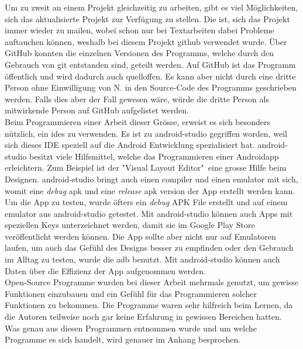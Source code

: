 \documentclass[a4paper,11pt]{article}
\begin{document}
Um zu zweit an einem Projekt gleichzeitig zu arbeiten, gibt es viel Möglichkeiten, sich das aktualisierte Projekt zur Verfügung zu stellen. Die  ist, sich das 
Projekt immer wieder zu mailen, wobei schon nur bei Textarbeiten dabei Probleme auftauchen können, weshalb bei diesem Projekt \Gls{github} 
verwendet wurde. Über GitHub konnten die einzelnen Versionen des Programms, welche durch den Gebrauch von \gls{git} entstanden sind, geteilt werden. 
Auf GitHub ist das Programm öffentlich und wird dadurch auch quelloffen. Es kann aber nicht durch eine dritte Person ohne Einwilligung von N. in den Source-Code
des Programms geschrieben werden. Falls dies aber der Fall gewesen wäre, würde die dritte Person als mitwirkende Person auf GitHub aufgelistet werden. \cite{github} \\

Beim Programmieren einer Arbeit dieser Grösse, erweist es sich besonders nützlich, ein \glspl{ide} zu verwenden. Es ist zu \gls{android-studio} gegriffen worden, weil sich dieses 
IDE speziell auf die Android Entwicklung spezialisiert hat. \gls{android-studio} besitzt viele Hilfsmittel, welche das Programmieren einer Androidapp erleichtern. Zum Beispiel ist der
"Visual Layout Editor"\ eine grosse Hilfe beim Designen. \gls{android-studio} bringt auch einen \gls{compiler} und einen \gls{emulator} mit sich, womit eine \textit{debug} \gls{apk} und eine
\textit{release} \gls{apk} version der App erstellt werden kann. Um die App zu testen, wurde öfters ein \textit{debug} APK File erstellt und auf einem \gls{emulator} aus \gls{android-studio}
getestet. Mit \gls{android-studio} können auch Apps mit speziellen Keys unterzeichnet werden, damit sie im Google Play Store veröffentlicht werden können.
Die App sollte aber nicht nur auf Emulatoren laufen, um auch das Gefühl des Designs besser zu empfinden oder den Gebrauch im Alltag zu testen, wurde die \gls{adb} benutzt.
Mit \gls{android-studio} können auch Daten über die Effizienz der App aufgenommen werden. 
\cite{android-studio} \\

Open-Source Programme wurden bei dieser Arbeit mehrmals genutzt, um gewisse Funktionen einzubauen und ein Gefühl für das Programmieren solcher Funktionen zu bekommen. Die Programme
waren sehr 
hilfreich beim Lernen, da die Autoren teilweise noch gar keine Erfahrung in gewissen Bereichen hatten. Was genau aus diesen Programmen entnommen wurde und um welche Programme es sich handelt, wird 
genauer im Anhang besprochen. 
\end{document}
